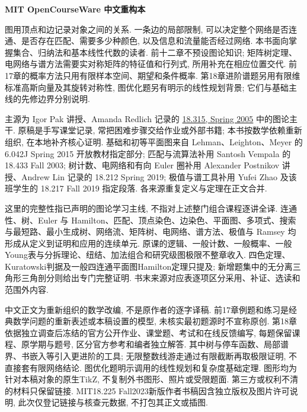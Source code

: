 \frontmatter
\begin{center}
{\color{structurecolor}\bfseries\fontsize{18}{25}\selectfont\BookTitle\par}
{\bfseries MIT OpenCourseWare 中文重构本\par}
\BookAuthor\par
\BookDate\par
\end{center}

\originalpreface
图用顶点和边记录对象之间的关系. 一条边的局部限制, 可以决定整个网络是否连通、是否存在匹配、需要多少种颜色, 以及信息和流量能否经过网络. 本书面向掌握集合、归纳法和基本线性代数的读者. 前十二章不预设图论知识; 矩阵树定理、电网络与谱方法需要实对称矩阵的特征值和行列式, 所用补充在相应位置交代. 前17章的概率方法只用有限样本空间、期望和条件概率. 第18章进阶谱题另用有限维标准高斯向量及其旋转对称性, 图优化题另有明示的线性规划背景; 它们与基础主线的先修边界分别说明.

主源为 Igor Pak 讲授、Amanda Redlich 记录的 \href{https://ocw.mit.edu/courses/18-315-combinatorial-theory-introduction-to-graph-theory-extremal-and-enumerative-combinatorics-spring-2005/pages/lecture-notes/}{18.315, Spring 2005} 中的图论主干. 原稿是手写课堂记录, 常把困难步骤交给作业或外部书籍; 本书按数学依赖重新组织, 在本地补齐核心证明. 基础和初等平面图来自 Lehman、Leighton、Meyer 的 6.042J Spring 2015 开放教材指定部分; 匹配与流算法补用 Santosh Vempala 的 18.433 Fall 2003; 树计数、电网络和有向 Euler 圈补用 Alexander Postnikov 讲授、Andrew Lin 记录的 18.212 Spring 2019; 极值与谱工具补用 Yufei Zhao 及该班学生的 18.217 Fall 2019 指定段落. 各来源重复定义与定理在正文合并.

这里的完整性指已声明的图论学习主线, 不指对上述整门组合课程逐讲全译. 连通性、树、Euler 与 Hamilton、匹配、顶点染色、边染色、平面图、多项式、搜索与最短路、最小生成树、网络流、矩阵树、电网络、谱方法、极值与 Ramsey 均形成从定义到证明和应用的连续单元. 原课的逻辑、一般计数、一般概率、一般Young表与分拆理论、纽结、加法组合和研究级图极限不整章收入. 四色定理、Kuratowski判据及一般四连通平面图Hamilton定理只提及; 新增题集中的无分离三角形三角剖分则给出专门完整证明. 书末来源对应表逐项区分采用、补证、选读和范围外内容.

中文正文为重新组织的数学改编, 不是原作者的逐字译稿. 前17章例题和练习是经典数学问题的重新表述或本稿设置的模型, 未核实最初题源时不宣称原创. 第18章依据独立调查后冻结的官方公开作业、课堂题、考试和在线反馈编写, 每题保留课程、原学期与题号, 区分官方参考和编者独立解答. 其中树与停车函数、局部谱界、书嵌入等引入更进阶的工具; 无限整数线游走通过有限截断再取极限证明, 不直接套有限网络结论. 图优化题明示调用的线性规划和复杂度基础定理. 图形均为针对本稿对象的原生TikZ, 不复制外书图形、照片或受限题面. 第三方或权利不清的材料只保留链接. MIT18.225 Fall2023新版作者书稿因含独立版权及图片许可说明, 此次仅登记链接与核查元数据, 不打包其正文或插图.

